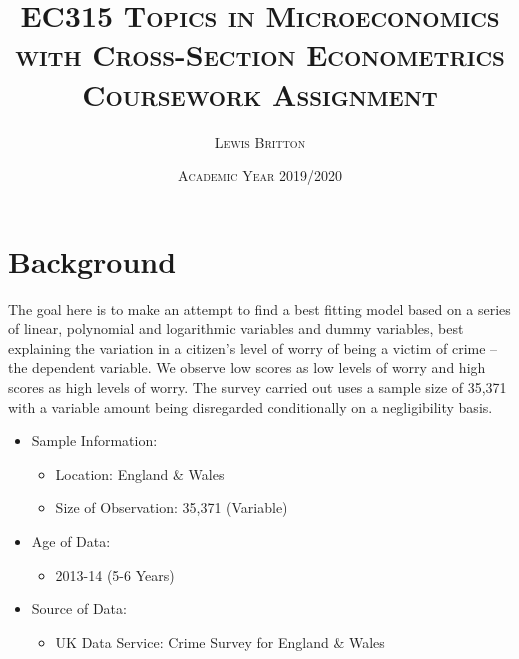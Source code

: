 \documentclass[11pt, english]{article}
\begin{document}
                               
                                              
                       
        \title{\textsc{EC315 Topics in Microeconomics with Cross-Section Econometrics\\ Coursework Assignment}}
        \author{\textsc{Lewis Britton}}
        \date{\textsc{Academic Year 2019/2020}}
        \maketitle

\newpage
                         

	\renewcommand{\contentsname}{Table of Contents}

        \tableofcontents

\newpage


\section{Background}

	The goal here is to make an attempt to find a best fitting model based on a series of linear, polynomial and logarithmic variables and dummy variables, best explaining the variation in a citizen’s level of worry of being a victim of crime – the dependent variable. We observe low scores as low levels of worry and high scores as high levels of worry. The survey carried out uses a sample size of 35,371 with a variable amount being disregarded conditionally on a negligibility basis.\\

	\begin{itemize}
	\setlength\itemsep{0cm}
		\item Sample Information:
		\begin{itemize}
			\item Location: England \& Wales
			\item Size of Observation: 35,371 (Variable)
		\end{itemize}
		\item Age of Data:
		\begin{itemize}
			\item 2013-14 (5-6 Years)
		\end{itemize}
		\item Source of Data:
		\begin{itemize}
			\item UK Data Service: Crime Survey for England \& Wales
		\end{itemize}
	\end{itemize}
\end{document}
